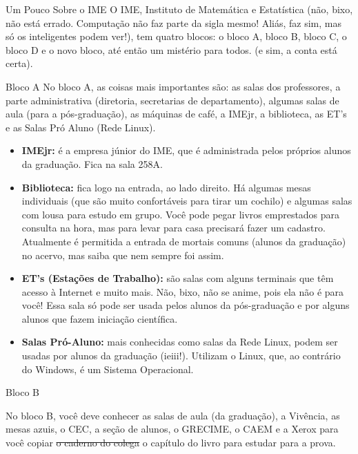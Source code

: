 \begin{secao}{Um Pouco Sobre o IME}
O IME, Instituto de Matemática e Estatística (não, bixo, não está errado.
Computação não faz parte da sigla mesmo! Aliás, faz sim, mas só os inteligentes
podem ver!), tem quatro blocos: o bloco A, bloco B, bloco C, o bloco D e o novo bloco, até então um mistério para todos. (e sim, a conta está certa).

\begin{subsecao}{Bloco A}
No bloco A, as coisas mais importantes são: as salas dos professores, a parte
administrativa (diretoria, secretarias de departamento), algumas salas de aula
(para a pós-graduação), as máquinas de café, a IMEjr, a biblioteca, as ET's e
as Salas Pró Aluno (Rede Linux).

\begin{itemize}

\item {\bf IMEjr:} é a empresa júnior do IME, que é administrada pelos próprios
alunos da graduação. Fica na sala 258A.

\item {\bf Biblioteca:} fica logo na entrada, ao lado direito. Há algumas mesas
individuais (que são muito confortáveis para tirar um cochilo) e algumas salas
com lousa para estudo em grupo. Você pode pegar livros emprestados para consulta
na hora, mas para levar para casa precisará fazer um cadastro. Atualmente é
permitida a entrada de mortais comuns (alunos da graduação) no acervo, mas saiba
que nem sempre foi assim.

\item {\bf ET's (Estações de Trabalho):} são salas com alguns terminais que têm
acesso à Internet e muito mais. Não, bixo, não se anime, pois ela não é para
você! Essa sala só pode ser usada pelos alunos da pós-graduação e por alguns
alunos que fazem iniciação científica.

\item {\bf Salas Pró-Aluno:} mais conhecidas como salas da Rede Linux, podem ser
usadas por alunos da graduação (ieiii!). Utilizam o Linux, que, ao contrário do
Windows, é um Sistema Operacional.

\end{itemize}
\end{subsecao}

\begin{subsecao}{Bloco B}

No bloco B, você deve conhecer as salas de aula (da graduação), a Vivência, as
mesas azuis, o CEC, a seção de alunos, o GRECIME, o CAEM e a Xerox para você
copiar \sout{o caderno do colega} o capítulo do livro para estudar para a prova.


\end{subsecao}
\end{secao}
